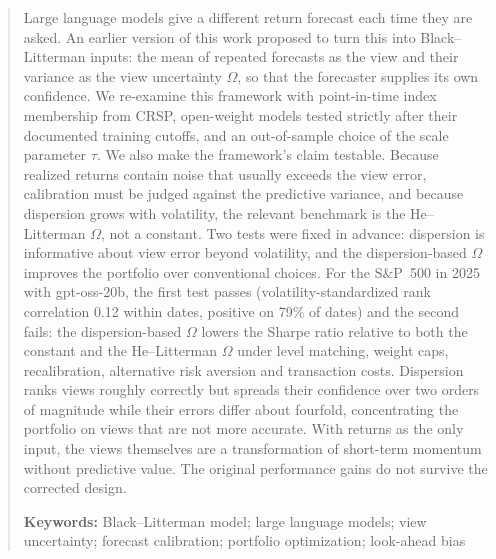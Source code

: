 \begin{abstract}
\noindent
Large language models give a different return forecast each time they are asked. An earlier version of this work proposed to turn this into Black--Litterman inputs: the mean of repeated forecasts as the view and their variance as the view uncertainty $\Omega$, so that the forecaster supplies its own confidence. We re-examine this framework with point-in-time index membership from CRSP, open-weight models tested strictly after their documented training cutoffs, and an out-of-sample choice of the scale parameter $\tau$. We also make the framework's claim testable. Because realized returns contain noise that usually exceeds the view error, calibration must be judged against the predictive variance, and because dispersion grows with volatility, the relevant benchmark is the He--Litterman $\Omega$, not a constant. Two tests were fixed in advance: dispersion is informative about view error beyond volatility, and the dispersion-based $\Omega$ improves the portfolio over conventional choices. For the S\&P~500 in 2025 with gpt-oss-20b, the first test passes (volatility-standardized rank correlation 0.12 within dates, positive on 79\% of dates) and the second fails: the dispersion-based $\Omega$ lowers the Sharpe ratio relative to both the constant and the He--Litterman $\Omega$ under level matching, weight caps, recalibration, alternative risk aversion and transaction costs. Dispersion ranks views roughly correctly but spreads their confidence over two orders of magnitude while their errors differ about fourfold, concentrating the portfolio on views that are not more accurate. With returns as the only input, the views themselves are a transformation of short-term momentum without predictive value. The original performance gains do not survive the corrected design. 

\medskip\noindent\textbf{Keywords:} Black--Litterman model; large language models; view uncertainty; forecast calibration; portfolio optimization; look-ahead bias
\end{abstract}
